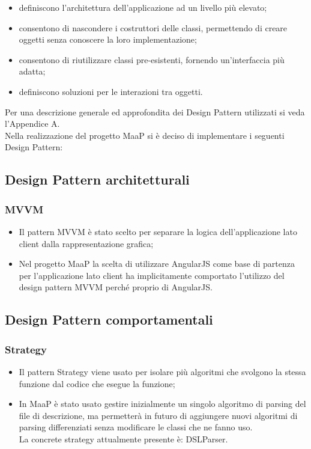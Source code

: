 \begin{itemize}
\item {} definiscono l'architettura dell'applicazione ad un livello più elevato;
\item {} consentono di nascondere i costruttori delle classi, permettendo di creare oggetti senza conoscere la loro implementazione;
\item {} consentono di riutilizzare classi pre-esistenti, fornendo un'interfaccia più adatta;
\item {} definiscono soluzioni per le interazioni tra oggetti.
\end{itemize}
Per una descrizione generale ed approfondita dei Design Pattern utilizzati si veda l'Appendice A.\\
Nella realizzazione del progetto MaaP si è deciso di implementare i seguenti Design Pattern:\\

\subsection{Design Pattern architetturali}
\subsubsection{MVVM}
\begin{itemize}
\item {} Il pattern MVVM è stato scelto per separare la logica dell'applicazione lato client dalla rappresentazione grafica;
\item {} Nel progetto MaaP la scelta di utilizzare AngularJS come base di partenza per l'applicazione lato client ha implicitamente comportato l'utilizzo del design pattern MVVM perché proprio di AngularJS.
\end{itemize}

\subsection{Design Pattern comportamentali}
\subsubsection{Strategy}
\begin{itemize}
\item {} Il pattern Strategy viene usato per isolare più algoritmi che svolgono la stessa funzione dal codice che esegue la funzione;
\item {} In MaaP è stato usato gestire inizialmente un singolo algoritmo di parsing del file di descrizione, ma permetterà in futuro di aggiungere nuovi algoritmi di parsing differenziati senza modificare le classi che ne fanno uso.\\
La concrete strategy attualmente presente è: DSLParser.
\end{itemize}

